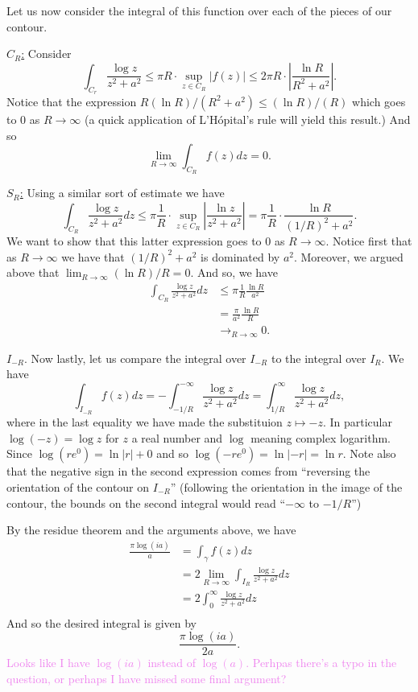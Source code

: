 \documentclass[12pt,letterpaper,boxed]{hmcpset}
\newcommand{\wg}[1]{\textcolor{violet}{#1}}
\newcommand{\abs}[1]{\left|#1\right|}
\begin{document}
\begin{solution}
Let us now consider the integral of this function over each of the
pieces of our contour.

\underline{$C_R$:} Consider \[
	\int_{C_r} \frac{\log z}{z^2 + a^2} \leq \pi R \cdot \sup_{z \in
	C_R} \abs{f(z)}
	\leq 2\pi R \cdot \abs{ \frac{\ln R}{R^2 + a^2} }.
\]
Notice that the expression $R (\ln R)/(R^2 + a^2) \leq (\ln
	R)/(R)$ which goes to $0$ as $R \to \infty$ (a quick application
	of L'H\'opital's rule will yield this result.)
And so \[
	\lim_{R \to \infty} \int_{C_R} f(z) dz = 0.
\]

\underline{$S_R$:} Using a similar sort of estimate we have \[
	\int_{C_R} \frac{\log z}{z^2 + a^2} dz 
	\leq \pi \frac{1}{R} \cdot \sup_{z \in C_R} \abs{ \frac{\ln z}{z^2 +
	a^2}}
	= \pi \frac{1}{R} \cdot \frac{\ln R}{(1/R)^2 + a^2}.
\]
We want to show that this latter expression goes to $0$ as $R \to
	\infty$. Notice first that as $R \to \infty$ we have that
	$(1/R)^2 + a^2$ is dominated by $a^2$. Moreover, we argued above
	that $\lim_{R \to \infty} (\ln R)/R = 0$.
And so, we have
\begin{align*}
	\int_{C_R} \frac{\log z}{z^2 + a^2} dz 
	&\leq \pi \frac{1}{R} \frac{\ln R}{a^2} \\
	&= \frac{\pi}{a^2} \frac{\ln R}{R} \\
	& \to_{R \to \infty} 0. 
\end{align*}

\underline{$I_{-R}$}. Now lastly, let us compare the integral over $I_{-R}$ to the integral
over $I_R$. We have \[
\int_{I_{-R}} f(z) dz = - \int_{-1/R}^{-\infty} \frac{\log z}{z^2 +
a^2} dz = \int_{1/R}^{\infty} \frac{\log z}{z^2 + a^2} dz,
\]
where in the last equality we have made the substituion $z \mapsto
-z$. In particular $\log(-z) = \log z$ for $z$ a real number and
$\log$ meaning complex logarithm. Since $\log(r e^0) = \ln\abs{r} + 0$
and so $\log(-r e^0) = \ln \abs{-r} = \ln{r}$. Note also that the
negative sign in the second expression comes from ``reversing the
orientation of the contour on $I_{-R}$'' (following the orientation in
the image of the
contour, the bounds on the second integral would read ``$-\infty$ to $-1/R$'')

By the residue theorem  and the arguments above, we have 
\begin{align*}
	\frac{\pi \log(ia)}{a} &= 
	\int_{\gamma} f(z) dz \\
	&= 2 \lim_{R\to \infty }\int_{I_R} \frac{\log z}{z^2 + a^2} dz \\
	&= 2 \int_{0}^\infty \frac{\log z}{z^2 + a^2} dz \\
\end{align*}
And so the desired integral is given by \[
	\frac{\pi \log(ia)}{2a}.
\]
	\wg{Looks like I have $\log(ia)$ instead of $\log(a)$. Perhpas
	there's a typo in the question, or perhaps I have missed some
	final argument?}


\end{solution}

\newpage
\end{document}
